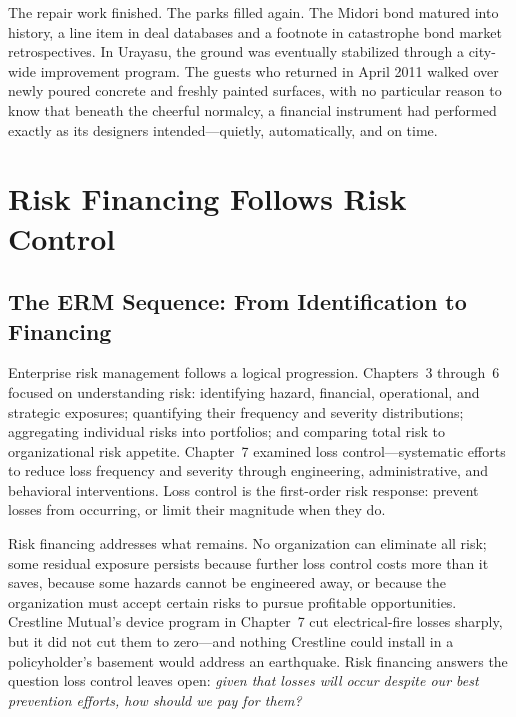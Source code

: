\documentclass[11pt,openany]{book}
\begin{document}
\begin{corporateexample}
The repair work finished. The parks filled again. The Midori bond matured into
history, a line item in deal databases and a footnote in catastrophe bond
market retrospectives. In Urayasu, the ground was eventually stabilized
through a city-wide improvement program. The guests who returned in April 2011
walked over newly poured concrete and freshly painted surfaces, with no
particular reason to know that beneath the cheerful normalcy, a financial
instrument had performed exactly as its designers intended---quietly,
automatically, and on time.

\end{corporateexample}

\section{Risk Financing Follows Risk Control}
\label{sec:financing-follows-control}

\subsection{The ERM Sequence: From Identification to Financing}

Enterprise risk management follows a logical progression. Chapters~3
through~6 focused on understanding risk: identifying hazard, financial,
operational, and strategic exposures; quantifying their frequency and severity
distributions; aggregating individual risks into portfolios; and comparing
total risk to organizational risk appetite. Chapter~7
examined loss control---systematic efforts to reduce loss frequency and
severity through engineering, administrative, and behavioral interventions.
Loss control is the first-order risk response: prevent losses from occurring,
or limit their magnitude when they do.

Risk financing addresses what remains. No organization can eliminate all
risk; some residual exposure persists because further loss control costs more
than it saves, because some hazards cannot be engineered away, or because the
organization must accept certain risks to pursue profitable opportunities.
Crestline Mutual's device program in Chapter~7 cut
electrical-fire losses sharply, but it did not cut them to zero---and nothing
Crestline could install in a policyholder's basement would address an
earthquake. Risk financing answers the question loss control leaves open:
\emph{given that losses will occur despite our best prevention efforts, how
should we pay for them?}
\end{document}
